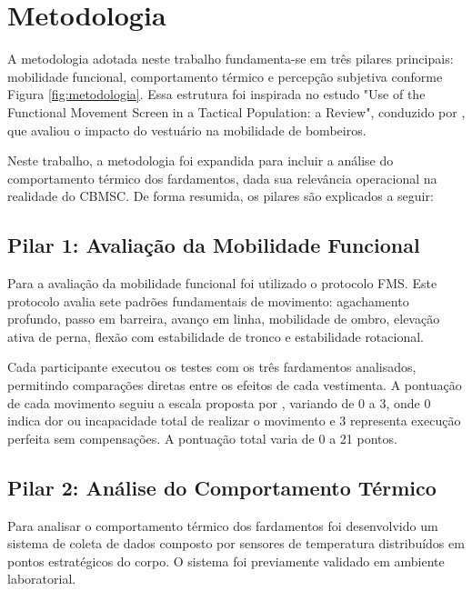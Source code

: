 \chapter{Metodologia}
\label{cap:metodologia}

A metodologia adotada neste trabalho fundamenta-se em três pilares principais: mobilidade funcional, 
comportamento térmico e percepção subjetiva conforme Figura \ref{fig:metodologia}. Essa estrutura foi inspirada no estudo "Use of the Functional Movement Screen in a Tactical Population: a Review", conduzido por 
\textcite{orr2019impact}, que avaliou o impacto do vestuário na mobilidade de bombeiros. 


Neste trabalho, a metodologia foi expandida para incluir a análise do comportamento térmico dos 
fardamentos, dada sua relevância operacional na realidade do CBMSC. De forma resumida, os pilares 
são explicados a seguir:

\section{Pilar 1: Avaliação da Mobilidade Funcional}

Para a avaliação da mobilidade funcional foi utilizado o protocolo \acrfull{FMS}. 
Este protocolo avalia sete padrões fundamentais de movimento: agachamento profundo, passo em barreira, 
avanço em linha, mobilidade de ombro, elevação ativa de perna, flexão com estabilidade de tronco e 
estabilidade rotacional.

Cada participante executou os testes com os três fardamentos analisados, permitindo comparações 
diretas entre os efeitos de cada vestimenta. A pontuação de cada movimento seguiu a escala proposta 
por \textcite{cook2006pre}, variando de 0 a 3, onde 0 indica dor ou incapacidade total de realizar o 
movimento e 3 representa execução perfeita sem compensações. A pontuação total varia de 0 a 21 pontos.

\section{Pilar 2: Análise do Comportamento Térmico}

Para analisar o comportamento térmico dos fardamentos foi desenvolvido um sistema de coleta de dados 
composto por sensores de temperatura distribuídos em pontos estratégicos do corpo. O sistema foi 
previamente validado em ambiente laboratorial.

